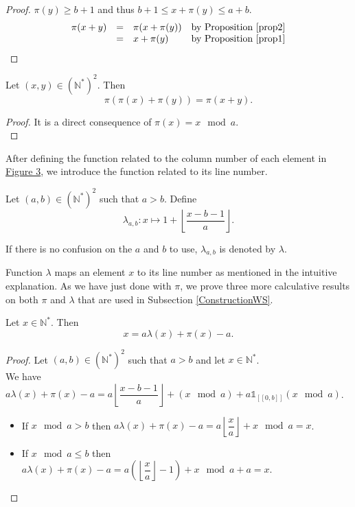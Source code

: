 \documentclass[final,onefignum,onetabnum]{siamart190516}
\begin{document}
\begin{proof}
\(\pi(y) \geqslant b + 1\) and thus \(b + 1 \leqslant x + \pi(y) \leqslant a + b\).
\[
\begin{array}{l l l l}
	\pi(x + y) & = & \pi(x + \pi(y)) & \text{by Proposition \ref{prop2}} \\
	 & = & x + \pi(y) & \text{by Proposition \ref{prop1}}
\end{array}
\]
\end{proof}

\begin{proposition}
\label{prop4}
Let \((x,y)\in (\mathbb{N}^*)^2\). Then
\[
\pi(\pi(x)+\pi(y))=\pi(x+y).
\]
\end{proposition}

\begin{proof}
It is a direct consequence of \(\pi(x) = x \mod a\). \\
\end{proof}

After defining the function related to the column number of each element in \hyperref[SchemaWS]{Figure 3},
we introduce the function related to its line number.

\begin{definition}
Let \((a,b) \in (\mathbb{N}^*)^2\) such that \(a>b\). Define
\[ \lambda_{a,b}:x \longmapsto 1+ \left\lfloor\dfrac{x-b-1}{a}\right\rfloor.\]
\end{definition}

If there is no confusion on the \(a\) and \(b\) to use, \(\lambda_{a, b}\) is denoted by \(\lambda\).

Function \(\lambda\) maps an element \(x\) to its line number as mentioned in the intuitive explanation.
As we have just done with \(\pi\), we prove three more calculative results on both \(\pi\) and \(\lambda\) that are used in
Subsection \ref{ConstructionWS}.

\begin{proposition}
\label{prop5}
Let \(x\in \mathbb{N}^*\). Then
\[
x=a\lambda(x)+\pi(x)-a.
\]
\end{proposition}

\begin{proof}
Let \((a,b)\in (\mathbb{N}^*)^2\) such that \(a>b\) and let \(x\in \mathbb{N}^*\). \\
We have \(a\lambda(x)+\pi(x)-a=a\left\lfloor\dfrac{x-b-1}{a}\right\rfloor+(x \mod a)+ a \mathds{1}_{ [\![0,b]\!]}(x \mod a)\).

\begin{itemize}
\item If \(x \mod a>b\) then \(a\lambda(x)+\pi(x)-a=a\left\lfloor\dfrac{x}{a}\right\rfloor+x \mod a=x\).
\item If \(x \mod a \leqslant b\) then \(a\lambda(x)+\pi(x)-a=a \left( \left \lfloor \dfrac{x}{a} \right \rfloor - 1 \right)+x \mod a +a=x\).
\end{itemize}
\end{proof}
\end{document}
